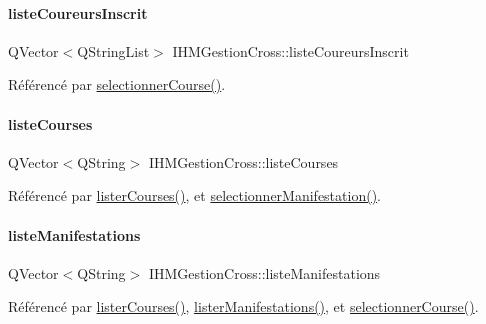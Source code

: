 \paragraph{\texorpdfstring{liste\+Coureurs\+Inscrit}{listeCoureursInscrit}}
{\footnotesize\ttfamily Q\+Vector$<$Q\+String\+List$>$ I\+H\+M\+Gestion\+Cross\+::liste\+Coureurs\+Inscrit\hspace{0.3cm}{\ttfamily [private]}}



Référencé par \hyperlink{class_i_h_m_gestion_cross_ae555b32462455a2cdaf0f8dc2e016d14}{selectionner\+Course()}.

\mbox{\label{class_i_h_m_gestion_cross_a66fc14c0ed874e72b6ada34e9b83603a}} 
\paragraph{\texorpdfstring{liste\+Courses}{listeCourses}}
{\footnotesize\ttfamily Q\+Vector$<$Q\+String$>$ I\+H\+M\+Gestion\+Cross\+::liste\+Courses\hspace{0.3cm}{\ttfamily [private]}}



Référencé par \hyperlink{class_i_h_m_gestion_cross_a34567afe3e94862ebd9af51528dedb65}{lister\+Courses()}, et \hyperlink{class_i_h_m_gestion_cross_a60fc58610d01534b3df66ac7dd76b4dc}{selectionner\+Manifestation()}.

\mbox{\label{class_i_h_m_gestion_cross_ac42ca910fa9802b3f63e3393aaa14e8a}} 
\paragraph{\texorpdfstring{liste\+Manifestations}{listeManifestations}}
{\footnotesize\ttfamily Q\+Vector$<$Q\+String$>$ I\+H\+M\+Gestion\+Cross\+::liste\+Manifestations\hspace{0.3cm}{\ttfamily [private]}}



Référencé par \hyperlink{class_i_h_m_gestion_cross_a34567afe3e94862ebd9af51528dedb65}{lister\+Courses()}, \hyperlink{class_i_h_m_gestion_cross_a0eadd8592c966c89bf7b5a25a0ae7589}{lister\+Manifestations()}, et \hyperlink{class_i_h_m_gestion_cross_ae555b32462455a2cdaf0f8dc2e016d14}{selectionner\+Course()}.


